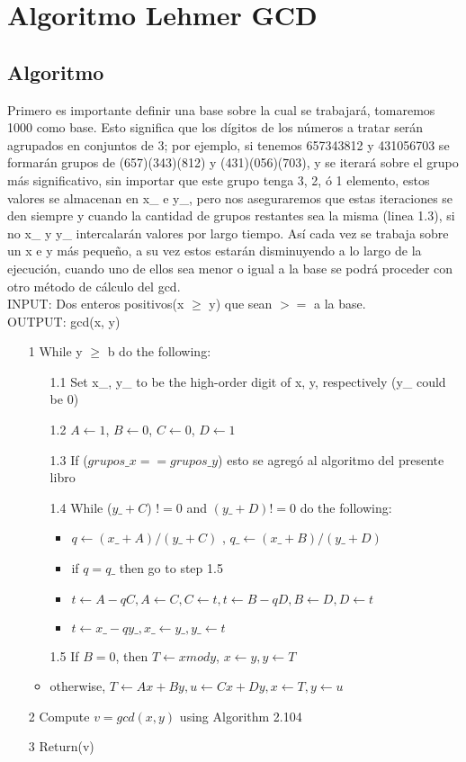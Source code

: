 \chapter{Algoritmo Lehmer GCD}

\section{Algoritmo}
Primero es importante definir una base sobre la cual se trabajará, tomaremos 1000 como base.
Esto significa que los dígitos de los números  a tratar serán agrupados en conjuntos de 3; por ejemplo,
si tenemos 657343812 y 431056703 se formarán grupos de (657)(343)(812) y (431)(056)(703), y se iterará 
sobre el grupo más significativo, sin importar que este grupo tenga 3, 2, ó 1 elemento, estos valores se almacenan en x\_ e y\_, pero nos aseguraremos que estas iteraciones se den siempre y cuando la cantidad de grupos restantes sea la misma (linea 1.3), si no x\_ y y\_ intercalarán valores por largo tiempo.
Así cada vez se trabaja sobre un x e y más pequeño, a su vez estos estarán disminuyendo a lo largo de la ejecución, cuando uno de ellos sea menor o igual a la base se podrá proceder con otro método de cálculo del gcd.\cite{Menezes1996}\\
INPUT: Dos enteros positivos(x $\geq$ y) que sean $>=$ a la base.\\
OUTPUT: gcd(x, y)\\
\begin{itemize}
 \item[1] While y $\geq$ b do the following:
 \begin{itemize}
  \item[1.1] Set x\_, y\_ to be the high-order digit of x, y, respectively (y\_ could be 0)
  \item[1.2] $A\leftarrow1$, $B\leftarrow0$, $C\leftarrow0$, $D\leftarrow1$ 
  \item[1.3] If ($grupos\_x == grupos\_y$) esto se agregó al algoritmo del presente libro 
  \item[1.4] While ($y\_ + C$) $!= 0$ and $(y\_ + D)!= 0$ do the following:
  \begin{itemize}
   \item $q\leftarrow (x\_ + A)/(y\_ + C)$ , $q\_ \leftarrow (x\_ + B)/(y\_+ D)$ 
   \item if $q = q\_$ then go to step 1.5
   \item $t \leftarrow A-qC, A \leftarrow C, C \leftarrow t, t\leftarrow B - qD, B\leftarrow D, D\leftarrow t$ 
   \item $t\leftarrow x\_ - qy\_, x\_\leftarrow y\_, y\_\leftarrow t$
  \end{itemize}
  \item[1.5] If $B = 0$, then $T \leftarrow x mod y$, $x\leftarrow y, y\leftarrow T$ 
  \item otherwise, $T\leftarrow Ax + By, u\leftarrow Cx + Dy, x\leftarrow T , y\leftarrow u$ \\
 \end{itemize}
 \item[2] Compute $v = gcd(x, y)$ using Algorithm 2.104 
 \item[3] Return(v)
\end{itemize}

